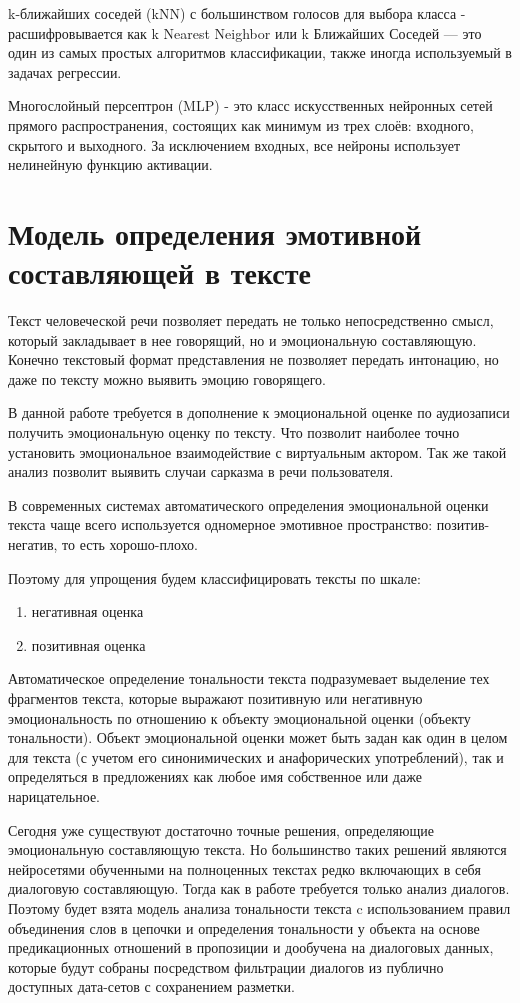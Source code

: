 k-ближайших соседей (kNN) с большинством голосов для выбора класса - 
расшифровывается как k Nearest Neighbor или k Ближайших Соседей — это один из самых простых алгоритмов классификации, также иногда используемый в задачах регрессии. 

Многослойный персептрон (MLP) -  это класс искусственных нейронных сетей прямого распространения, состоящих как минимум из трех слоёв: входного, скрытого и выходного.
За исключением входных, все нейроны использует нелинейную функцию активации.

\section{Модель определения эмотивной составляющей в тексте}

Текст человеческой речи позволяет передать не только непосредственно смысл, который закладывает в нее говорящий,
но и эмоциональную составляющую. Конечно текстовый формат представления не позволяет передать интонацию, но
даже по тексту можно выявить эмоцию говорящего.

В данной работе требуется в дополнение к эмоциональной оценке по аудиозаписи получить эмоциональную оценку
по тексту. Что позволит наиболее точно установить эмоциональное взаимодействие с виртуальным актором.
Так же такой анализ позволит выявить случаи сарказма в речи пользователя.

В современных системах автоматического определения эмоциональной
оценки текста чаще всего используется одномерное эмотивное пространство:
позитив-негатив, то есть хорошо-плохо.

Поэтому для упрощения будем классифицировать тексты по шкале:

\begin{enumerate}
  \item негативная оценка
  \item позитивная оценка
\end{enumerate}

Автоматическое определение тональности текста подразумевает выделение тех фрагментов текста, 
которые выражают позитивную или негативную эмоциональность по отношению к объекту эмоциональной оценки (объекту
тональности). Объект эмоциональной оценки может быть задан как один
в целом для текста (с учетом его синонимических и анафорических употреблений), 
так и определяться в предложениях как любое имя собственное или даже нарицательное.

Сегодня уже существуют достаточно точные решения, определяющие эмоциональную составляющую текста.
Но большинство таких решений являются нейросетями обученными на полноценных текстах редко включающих в себя
диалоговую составляющую. Тогда как в работе требуется только анализ диалогов. Поэтому
будет взята модель анализа тональности текста c использованием правил объединения слов в цепочки
и определения тональности у объекта на основе предикационных отношений
в пропозиции и дообучена на диалоговых данных, которые 
будут собраны посредством фильтрации диалогов из публично доступных дата-сетов с сохранением разметки.

